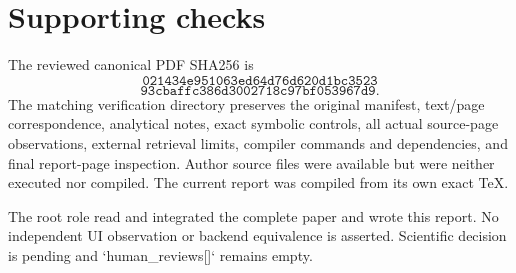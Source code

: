 \documentclass[10pt]{article}
\begin{document}
\section*{Supporting checks}
The reviewed canonical PDF SHA256 is \[\texttt{021434e951063ed64d76d620d1bc3523}\] \[\texttt{93cbaffc386d3002718c97bf053967d9}.\] The matching verification directory preserves the original manifest, text/page correspondence, analytical notes, exact symbolic controls, all actual source-page observations, external retrieval limits, compiler commands and dependencies, and final report-page inspection. Author source files were available but were neither executed nor compiled. The current report was compiled from its own exact TeX.\par
The root role read and integrated the complete paper and wrote this report. No independent UI observation or backend equivalence is asserted. Scientific decision is pending and `human\_reviews[]` remains empty.\par
\end{document}
